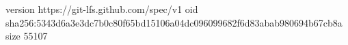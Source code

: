 version https://git-lfs.github.com/spec/v1
oid sha256:5343d6a3e3dc7b0c80f65bd15106a04dc096099682f6d83abab980694b67cb8a
size 55107
